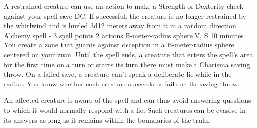     A restrained creature can use an action to make a Strength or Dexterity check against your spell save DC.
    If successful, the creature is no longer restrained by the whirlwind and is hurled 3d12 meters away from it in a random direction.
    {Alchemy spell - 3 spell points}
    {2 actions}
    {B-meter-radius sphere}
    {V, S}
    {10 minutes}
    You create a zone that guards against deception in a B-meter-radius sphere centered on your zuan.
    Until the spell ends, a creature that enters the spell's area for the first time on a turn or starts its turn there must make a Charisma saving throw.
    On a failed save, a creature can't speak a deliberate lie while in the radius.
    You know whether each creature succeeds or fails on its saving throw.

    An affected creature is aware of the spell and can thus avoid answering questions to which it would normally respond with a lie.
    Such creatures can be evasive in its answers as long as it remains within the boundaries of the truth.

\newpage~\newpage
